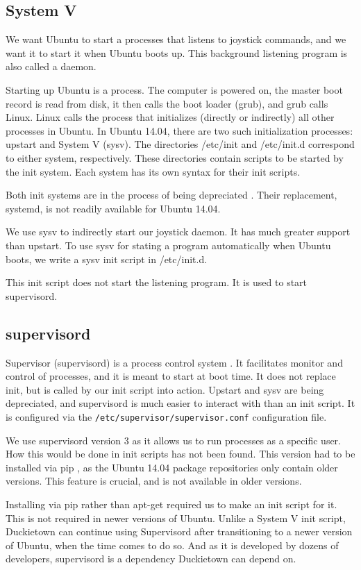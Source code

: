 \documentclass[titlepage]{article}
\begin{document}
\subsection{System V}
We want Ubuntu  to start a processes that listens to joystick commands, and we want it to start it when Ubuntu boots up. This background listening program is also called a daemon. 

Starting up Ubuntu is a process. The computer is powered on, the master boot record is read from disk, it then calls the boot loader (grub), and grub calls Linux. Linux calls the process that initializes (directly or indirectly) all other processes in Ubuntu. 
In Ubuntu 14.04, there are two such initialization processes: upstart and System V (sysv). %
The directories /etc/init and /etc/init.d correspond to either system, respectively. These directories contain scripts to be started by the init system. Each system has its own syntax for their init scripts. 

Both init systems are in the process of being depreciated \cite{shuttleworth}. Their replacement, systemd, is not readily available for Ubuntu 14.04. 

We use sysv to indirectly start our joystick daemon. It has much greater support than upstart. To use sysv for stating a program automatically when Ubuntu boots, we write a sysv init script in /etc/init.d.

This init script does not start the listening program. It is used to start supervisord. 
\subsection{supervisord}
Supervisor (supervisord) is a process control system \cite{supervisord}. It facilitates monitor and control of processes, and it is meant to start at boot time. It does not replace init, but is called by our init script into action. Upstart and sysv are being depreciated, and supervisord is much easier to interact with than an init script. It is configured via the \texttt{/etc/supervisor/supervisor.conf} configuration file.

We use supervisord version 3 as it allows us to run processes as a specific user. How this would be done in init scripts has not been found. This version had to be installed via pip \cite{pypi}, as the Ubuntu 14.04 package repositories only contain older versions. This feature is crucial, and is not available in older versions. 

Installing via pip rather than apt-get required us to make an init script for it. This is not required in newer versions of Ubuntu. Unlike a System V init script, Duckietown can continue using Supervisord after transitioning to a newer version of Ubuntu, when the time comes to do so. And as it is developed by dozens \cite{svd devs} of developers, supervisord is a dependency Duckietown can depend on.
\end{document}
